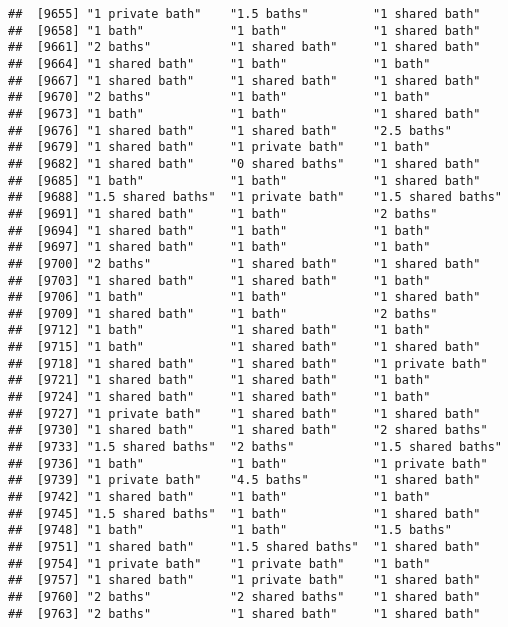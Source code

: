 \documentclass[
]{article}
\begin{document}
\begin{verbatim}
##  [9655] "1 private bath"    "1.5 baths"         "1 shared bath"    
##  [9658] "1 bath"            "1 bath"            "1 shared bath"    
##  [9661] "2 baths"           "1 shared bath"     "1 shared bath"    
##  [9664] "1 shared bath"     "1 bath"            "1 bath"           
##  [9667] "1 shared bath"     "1 shared bath"     "1 shared bath"    
##  [9670] "2 baths"           "1 bath"            "1 bath"           
##  [9673] "1 bath"            "1 bath"            "1 shared bath"    
##  [9676] "1 shared bath"     "1 shared bath"     "2.5 baths"        
##  [9679] "1 shared bath"     "1 private bath"    "1 bath"           
##  [9682] "1 shared bath"     "0 shared baths"    "1 shared bath"    
##  [9685] "1 bath"            "1 bath"            "1 shared bath"    
##  [9688] "1.5 shared baths"  "1 private bath"    "1.5 shared baths" 
##  [9691] "1 shared bath"     "1 bath"            "2 baths"          
##  [9694] "1 shared bath"     "1 bath"            "1 bath"           
##  [9697] "1 shared bath"     "1 bath"            "1 bath"           
##  [9700] "2 baths"           "1 shared bath"     "1 shared bath"    
##  [9703] "1 shared bath"     "1 shared bath"     "1 bath"           
##  [9706] "1 bath"            "1 bath"            "1 shared bath"    
##  [9709] "1 shared bath"     "1 bath"            "2 baths"          
##  [9712] "1 bath"            "1 shared bath"     "1 bath"           
##  [9715] "1 bath"            "1 shared bath"     "1 shared bath"    
##  [9718] "1 shared bath"     "1 shared bath"     "1 private bath"   
##  [9721] "1 shared bath"     "1 shared bath"     "1 bath"           
##  [9724] "1 shared bath"     "1 shared bath"     "1 bath"           
##  [9727] "1 private bath"    "1 shared bath"     "1 shared bath"    
##  [9730] "1 shared bath"     "1 shared bath"     "2 shared baths"   
##  [9733] "1.5 shared baths"  "2 baths"           "1.5 shared baths" 
##  [9736] "1 bath"            "1 bath"            "1 private bath"   
##  [9739] "1 private bath"    "4.5 baths"         "1 shared bath"    
##  [9742] "1 shared bath"     "1 bath"            "1 bath"           
##  [9745] "1.5 shared baths"  "1 bath"            "1 shared bath"    
##  [9748] "1 bath"            "1 bath"            "1.5 baths"        
##  [9751] "1 shared bath"     "1.5 shared baths"  "1 shared bath"    
##  [9754] "1 private bath"    "1 private bath"    "1 bath"           
##  [9757] "1 shared bath"     "1 private bath"    "1 shared bath"    
##  [9760] "2 baths"           "2 shared baths"    "1 shared bath"    
##  [9763] "2 baths"           "1 shared bath"     "1 shared bath"    

\end{verbatim}
\end{document}

